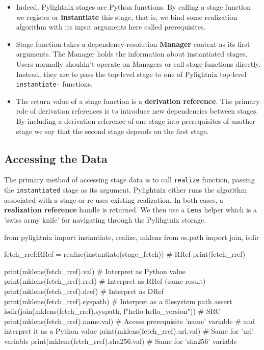 \begin{itemize}

  \item Indeed, Pylightnix stages are Python functions. By calling a stage
    function we register or \textbf{instantiate} this stage, that is, we bind
    some realization algorithm with its input arguments here called
    prerequisites.

  \item Stage function takes a dependency-resolution \textbf{Manager} context as
    its first arguments. The Manager holds the information about instantiated
    stages. Users normally shouldn't operate on Managers or call stage functions
    directly. Instead, they are to pass the top-level stage to one of Pylightnix
    top-level \texttt{instantiate-} functions.

  \item The return value of a stage function is a \textbf{derivation reference}.
    The primary role of derivation references is to introduce new dependencies
    between stages. By including a derivation reference of one stage into
    prerequisites of another stage we say that the second stage depends on the
    first stage.


\end{itemize}

\pagebreak
\subsection{Accessing the Data}

The primary method of accessing stage data is to call \texttt{realize} function,
passing the \texttt{instantiated} stage as its argument. Pylightnix either runs
the algorithm associated with a stage or re-uses existing realization. In both
cases, a \textbf{realization reference} handle is returned. We then use a
\texttt{Lens} helper which is a 'swiss army knife' for navigating through the
Pylihgtnix storage.

\begin{pythontexcode}
from pylightnix import instantiate, realize, mklens
from os.path import join, isdir

fetch_rref:RRef = realize(instantiate(stage_fetch))  # RRef \label{RREF}
print(fetch_rref)

print(mklens(fetch_rref).val)      # Interpret as Python value
print(mklens(fetch_rref).rref)     # Interpret as RRef (same result)
print(mklens(fetch_rref).dref)     # Interpret as DRef
print(mklens(fetch_rref).syspath)  # Interpret as a filesystem path
assert isdir(join(mklens(fetch_rref).syspath,
             f"hello-{hello_version}"))  # SRC \label{SRC}
print(mklens(fetch_rref).name.val) # Access prerequisite 'name' variable
                                   # and interpret it as a Python value
print(mklens(fetch_rref).url.val)  # Same for 'url' variable
print(mklens(fetch_rref).sha256.val)  # Same for 'sha256' variable
\end{pythontexcode}


